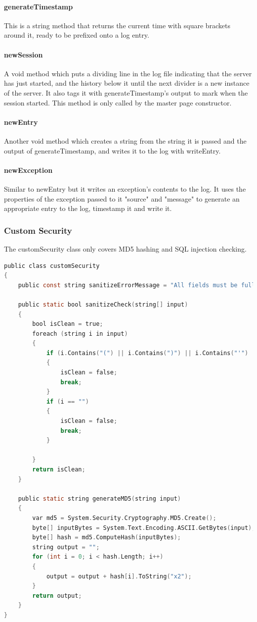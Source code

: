 ﻿\documentclass{article}
\begin{document}
    \paragraph{generateTimestamp} This is a string method that returns the current time with square brackets around it, ready to be prefixed onto a log entry.
    \paragraph{newSession} A void method which puts a dividing line in the log file indicating that the server has just started, and the history below it until the next divider is a new instance of the server.
    It also tags it with generateTimestamp's output to mark when the session started.
    This method is only called by the master page constructor.
    \paragraph{newEntry} Another void method which creates a string from the string it is passed and the output of generateTimestamp, and writes it to the log with writeEntry.
    \paragraph{newException} Similar to newEntry but it writes an exception's contents to the log.
    It uses the properties of the exception passed to it "source" and "message" to generate an appropriate entry to the log, timestamp it and write it.
    \newpage
    \subsubsection{Custom Security}
    The customSecurity class only covers MD5 hashing and SQL injection checking.
    \begin{lstlisting}[language=C]
public class customSecurity
{
    public const string sanitizeErrorMessage = "All fields must be full. The (, ), +, -, = and ' characters are not allowed in ANY fields";

    public static bool sanitizeCheck(string[] input)
    {
        bool isClean = true;
        foreach (string i in input)
        {
            if (i.Contains("(") || i.Contains(")") || i.Contains("'") || i.Contains("=") || i.Contains("-") || i.Contains("+"))
            {
                isClean = false;
                break;
            }
            if (i == "")
            {
                isClean = false;
                break;
            }

        }
        return isClean;
    }

    public static string generateMD5(string input)
    {
        var md5 = System.Security.Cryptography.MD5.Create();
        byte[] inputBytes = System.Text.Encoding.ASCII.GetBytes(input);
        byte[] hash = md5.ComputeHash(inputBytes);
        string output = "";
        for (int i = 0; i < hash.Length; i++)
        {
            output = output + hash[i].ToString("x2");
        }
        return output;
    }
}
    \end{lstlisting}
\end{document}
